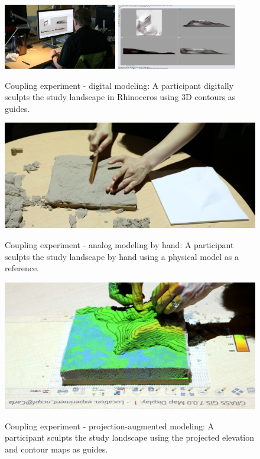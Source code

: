 \documentclass[prodmode,acmtochi]{acmsmall} %
\begin{document}
\begin{figure}
\begin{center}
	\includegraphics[height=108px]{images/experiments/art_rhino.jpg}
	\includegraphics[height=108px]{images/experiments/rhino.png}
	\caption{Coupling experiment - digital modeling:
	A participant digitally sculpts the study landscape in Rhinoceros
	using 3D contours as guides.}
	\label{fig:rhino}
	\includegraphics[width=\textwidth]{images/experiments/connie_analog_1.jpg}
	\caption{Coupling experiment - analog modeling by hand:
	A participant sculpts the study landscape by hand
	using a physical model as a reference.}
	\label{fig:analog}
	\includegraphics[width=\textwidth]{images/experiments/carla_proj_aug.jpg}
	\caption{Coupling experiment - projection-augmented modeling:
	A participant sculpts the study landscape using
	the projected elevation and contour maps
	as guides.}
	\label{fig:proj_aug}
\end{center}
\end{figure}
\end{document}
